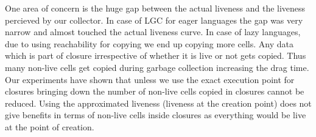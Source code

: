 \documentclass[9pt]{sigplanconf}
\newcommand{\comment}[1]{{\color{Myblue}{(#1)}}}
\begin{document}
One area of concern is the huge gap between the actual liveness and the 
liveness percieved by our collector. In case of LGC for eager languages the 
gap was very narrow and almost touched the actual liveness curve. 
In case of lazy languages, due to using reachability for copying we end up copying 
more cells. Any data which is part of closure irrespective of whether it is live 
or not gets copied. Thus many non-live cells get copied during garbage collection 
increasing the drag time.
Our experiments have shown that unless we use the exact execution point for 
closures bringing down the number of non-live cells copied in closures cannot be reduced.
Using the approximated liveness (liveness at the creation point) does not give benefits in terms of non-live
 cells inside closures as everything would be live at the point of creation.
\end{document}
